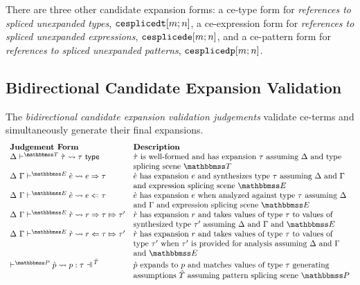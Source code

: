 There are three other candidate expansion forms: a ce-type form for \emph{references to spliced unexpanded types}, $\texttt{cesplicedt}[m; n]$, a ce-expression form for \emph{references to spliced unexpanded expressions}, $\texttt{cesplicede}[m; n]$, and a ce-pattern form for \emph{references to spliced unexpanded patterns}, $\texttt{cesplicedp}[m; n]$. %

\subsection{Bidirectional Candidate Expansion Validation}\label{sec:ce-validation-B}
The \emph{bidirectional candidate expansion validation judgements} validate ce-terms and simultaneously generate their final expansions.
\[\begin{array}{ll}
\textbf{Judgement Form} & \textbf{Description}\\
\cvalidT{\Delta}{\tscenev}{\ctau}{\tau} & \text{$\ctau$ is well-formed and has expansion $\tau$ assuming $\Delta$ and type}\\
& \text{splicing scene $\tscenev$}\\
\csynX{\ce}{e}{\tau} & \text{$\ce$ has expansion $e$ and synthesizes type $\tau$ assuming $\Delta$ and $\Gamma$}\\
& \text{and expression splicing scene $\escenev$}\\
\canaX{\ce}{e}{\tau} & \text{$\ce$ has expansion $e$ when analyzed against type $\tau$ assuming $\Delta$}\\
& \text{and $\Gamma$ and expression splicing scene $\escenev$}\\
\crsyn{\Delta}{\Gamma}{\escenev}{\crv}{r}{\tau}{\tau'} & \text{$\crv$ has expansion $r$ and takes values of type $\tau$ to values of}\\
& \text{synthesized type $\tau'$ assuming $\Delta$ and $\Gamma$ and $\escenev$}\\
\crana{\Delta}{\Gamma}{\escenev}{\crv}{r}{\tau}{\tau'} & \text{$\crv$ has expansion $r$ and takes values of type $\tau$ to values of}\\
& \text{type $\tau'$ when $\tau'$ is provided for analysis assuming $\Delta$ and $\Gamma$}\\
& \text{and $\escenev$}\\
\cvalidP{\upctx}{\pscenev}{\cpv}{p}{\tau} & \text{$\cpv$ expands to $p$ and matches values of type $\tau$ generating}\\
& \text{assumptions $\upctx$ assuming pattern splicing scene $\pscenev$}
\end{array}\]
